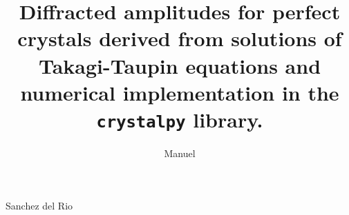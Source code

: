 \documentclass[preprint]{iucr}              %
\begin{document}



\title{Diffracted amplitudes for perfect crystals derived from solutions of Takagi-Taupin equations and numerical implementation in the \texttt{crystalpy} library.}
%


\author[a]{Manuel}{Sanchez del Rio}











\end{document}
